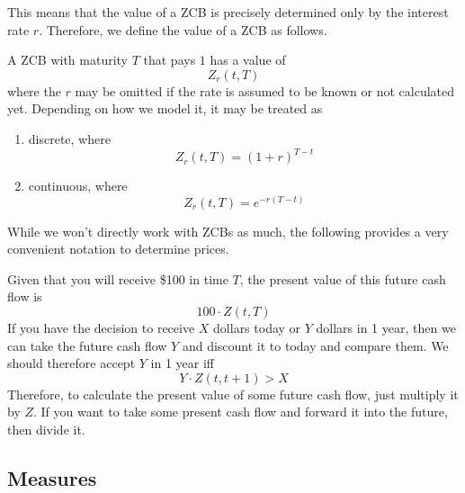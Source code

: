 \documentclass{article}
\begin{document}
    This means that the value of a ZCB is precisely determined only by the interest rate $r$. Therefore, we define the value of a ZCB as follows. 

    \begin{definition}[ZCB]
      A ZCB with maturity $T$ that pays $1$ has a value of 
      \begin{equation}
        Z_r (t, T) 
      \end{equation}
      where the $r$ may be omitted if the rate is assumed to be known or not calculated yet. Depending on how we model it, it may be treated as 
      \begin{enumerate}
        \item discrete, where 
          \begin{equation}
            Z_r (t, T) = (1 + r)^{T - t}
          \end{equation}
        \item continuous, where 
          \begin{equation}
            Z_r (t, T) = e^{- r (T - t)}
          \end{equation}
      \end{enumerate}
    \end{definition}

    While we won't directly work with ZCBs as much, the following provides a very convenient notation to determine prices. 

    \begin{example}
      Given that you will receive \$100 in time $T$, the present value of this future cash flow is 
      \begin{equation}
        100 \cdot Z(t, T)
      \end{equation}
      If you have the decision to receive $X$ dollars today or $Y$ dollars in 1 year, then we can take the future cash flow $Y$ and discount it to today and compare them. We should therefore accept $Y$ in 1 year iff 
      \begin{equation}
        Y \cdot Z(t, t + 1) > X  
      \end{equation}
      Therefore, to calculate the present value of some future cash flow, just multiply it by $Z$. If you want to take some present cash flow and forward it into the future, then divide it. 
    \end{example}

  \subsection{Measures}
\end{document}
